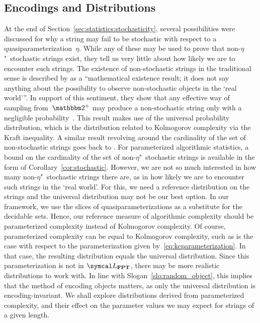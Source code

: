 \subsection{Encodings and Distributions}
\label{sec:statistics:encodings_distributions}%
At the end of Section~\ref{sec:statistics:stochasticity}, several possibilities were discussed for why a string may fail to be stochastic with respect to a quasiparameterization~$\eta$.
While any of these may be used to prove that non-$\eta$"~stochastic strings exist, they tell us very little about how likely we are to encounter such strings.
The existence of non-stochastic strings in the traditional sense is described by \citeauthor{vereshchagin2017algorithmic} as a \enquote{mathematical existence result; it does not say anything about the possibility to observe non-stochastic objects in the \enquote{real world}}.
In support of this sentiment, they show that any effective way of sampling from~$\binary^+$ may produce a non-stochastic string only with a negligible probability~\parencite{muchnik1998mathematical,vereshchagin2017algorithmic}.
This result makes use of the universal probability distribution, which is the distribution related to Kolmogorov complexity via the Kraft inequality.
A similar result revolving around the cardinality of the set of non-stochastic strings goes back to \textcite[Theorem~3]{shen1983concept}.
For parameterized algorithmic statistics, a bound on the cardinality of the set of non-$\eta$"~stochastic strings is available in the form of Corollary~\ref{cor:stochastic}.
However, we are not so much interested in how many non-$\eta$"~stochastic strings there are, as in how likely we are to encounter such strings in the \enquote*{real world}.
For this, we need a reference distribution on the strings and the universal distribution may not be our best option.
In our framework, we use the slices of quasiparameterizations as a substitute for the decidable sets.
Hence, our reference measure of algorithmic complexity should be parameterized complexity instead of Kolmogorov complexity.
Of course, parameterized complexity can be equal to Kolmogorov complexity, such as is the case with respect to the parameterization given by~\eqref{eq:kcparameterization}.
In that case, the resulting distribution equals the universal distribution.
Since this parameterization is not in $\calL_\cl{FPT}$, there may be more realistic distributions to work with.
In line with Slogan~\ref{slo:random_object}, this implies that the method of encoding objects matters, as only the universal distribution is encoding-invariant.
We shall explore distributions derived from parameterized complexity, and their effect on the parameter values we may expect for strings of a given length.

